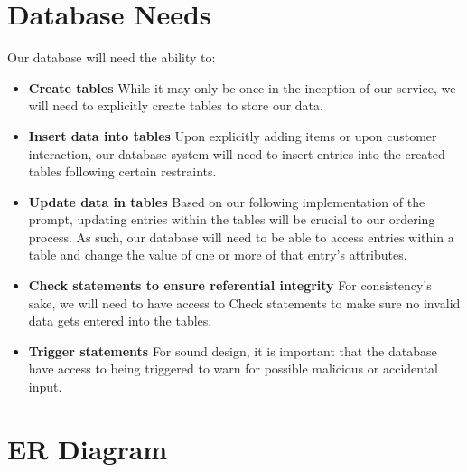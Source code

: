 \documentclass[letterpaper]{article}
\begin{document}
\section{Database Needs}
Our database will need the ability to:
\begin{itemize}

\item \textbf{Create tables} While it may only be once in the inception of our service, we will need to explicitly create tables to store our data.

\item \textbf{Insert data into tables}  Upon explicitly adding items or upon customer interaction, our database system will need to insert entries into the created tables following certain restraints.

\item \textbf{Update data in tables} Based on our following implementation of the prompt, updating entries within the tables will be crucial to our ordering process.  As such, our database will need to be able to access entries within a table and change the value of one or more of that entry’s attributes.

\item \textbf{Check statements to ensure referential integrity} For consistency’s sake, we will need to have access to Check statements to make sure no invalid data gets entered into the tables.

\item \textbf{Trigger statements} For sound design, it is important that the database have access to being triggered to warn for possible malicious or accidental input.

\end{itemize}
\hfill










\section{ER Diagram}
\end{document}
